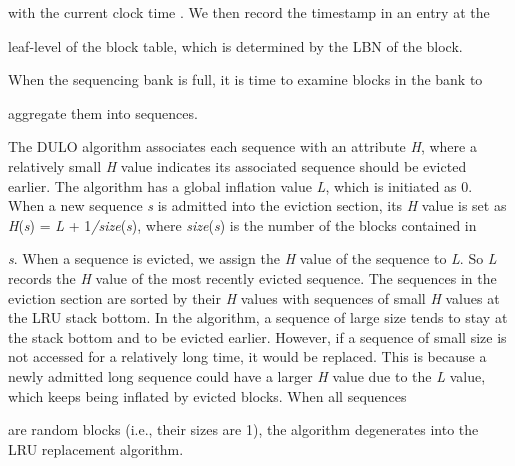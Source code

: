 \documentclass[12pt]{article}
\begin{document}
{\fontsize{10pt}{12.0pt}\selectfont with the current clock time . We then record the timestamp in an entry at the\par}\par

\setlength{\parskip}{8.04pt}
{\fontsize{10pt}{12.0pt}\selectfont leaf-level of the block table, which is determined by the LBN of the block.\par}\par

\setlength{\parskip}{0.0pt}
{\fontsize{10pt}{12.0pt}\selectfont When the sequencing bank is full, it is time to examine blocks in the bank to\par}\par

\setlength{\parskip}{8.04pt}
{\fontsize{10pt}{12.0pt}\selectfont aggregate them into sequences.\par}\par

\setlength{\parskip}{0.0pt}
{\fontsize{10pt}{12.0pt}\selectfont The DULO algorithm associates each sequence with an attribute \textit{H}, where a relatively small \textit{H }value indicates its associated sequence should be evicted earlier. The algorithm has a global inflation value \textit{L}, which is initiated as 0. When a new sequence \textit{s }is admitted into the eviction section, its \textit{H }value is set as \textit{H}(\textit{s}) = \textit{L }+ 1\textit{/size}(\textit{s}), where \textit{size}(\textit{s}) is the number of the blocks contained in\par}\par

{\fontsize{10pt}{12.0pt}\selectfont \textit{s}. When a sequence is evicted, we assign the \textit{H }value of the sequence to \textit{L}. So \textit{L }records the \textit{H }value of the most recently evicted sequence. The sequences in the eviction section are sorted by their \textit{H }values with sequences of small \textit{H} values at the LRU stack bottom. In the algorithm, a sequence of large size tends to stay at the stack bottom and to be evicted earlier. However, if a sequence of small size is not accessed for a relatively long time, it would be replaced. This is because a newly admitted long sequence could have a larger \textit{H }value due to the \textit{L }value, which keeps being inflated by evicted blocks. When all sequences\par}\par

{\fontsize{10pt}{12.0pt}\selectfont are random blocks (i.e., their sizes are 1), the algorithm degenerates into the LRU replacement algorithm.\par}\par
\end{document}
